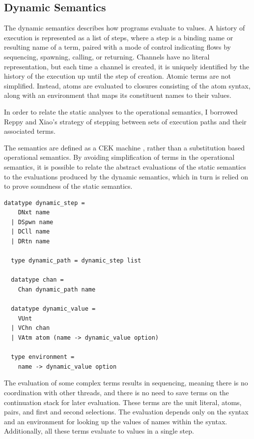 \documentclass[10pt]{article}
\begin{document}
\subsection{Dynamic Semantics}
The dynamic semantics describes how programs evaluate to values.
A history of execution is represented as a list of steps, where a step is a
binding name or resulting name of a term, paired with a mode of control indicating
flows by sequencing, spawning, calling, or returning.
Channels have no literal representation, but each
time a channel is created, it is uniquely identified by the history of the execution up until
the step of creation. Atomic terms are not simplified. Instead, atoms are evaluated to
closures consisting of the atom syntax, along with an environment that maps its
constituent names to their values.

In order to relate the static analyses to the operational semantics, I
borrowed Reppy and Xiao's strategy of stepping between sets of execution paths and
their associated terms.

The semantics are defined as a CEK machine \cite{}, rather than a
substitution based operational semantics. By avoiding simplification of terms in the
operational semantics, it is possible to relate
the abstract evaluations of the static semantics to the
evaluations produced by the dynamic semantics,
which in turn is relied on to prove soundness of the static semantics.


\begin{lstlisting}[language=logic]
  datatype dynamic_step =
    DNxt name
  | DSpwn name
  | DCll name
  | DRtn name 

  type dynamic_path = dynamic_step list

  datatype chan =
    Chan dynamic_path name 

  datatype dynamic_value = 
    VUnt
  | VChn chan
  | VAtm atom (name -> dynamic_value option)

  type environment =
    name -> dynamic_value option
\end{lstlisting}

The evaluation of some complex terms results in sequencing, meaning there is no coordination
with other threads, and there is no need to save terms on
the continuation stack for later evaluation. These terms are the
unit literal, atoms, pairs, and first and second selections. The evaluation depends only
on the syntax and an environment for looking up the values of names within the syntax.
Additionally, all these terms evaluate to values in a single step.
\end{document}
